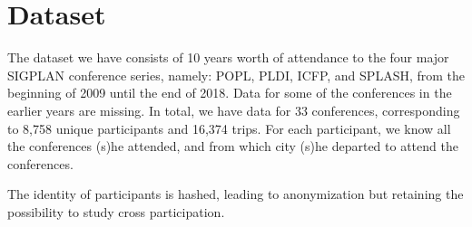 \section{Dataset}
\label{sec:dataset}
 
The dataset we have consists of 10 years worth of attendance to the four major
SIGPLAN conference series, namely: POPL, PLDI, ICFP, and SPLASH, from the
beginning of 2009 until the end of 2018. Data for some of the conferences in the
earlier years are missing. In total, we have data for 33 conferences,
corresponding to 8,758 unique participants and 16,374 trips. For each
participant, we know all the conferences (s)he attended, and from which city
(s)he departed to attend the conferences.

The identity of participants is hashed, leading to anonymization but retaining
the possibility to study cross participation.


